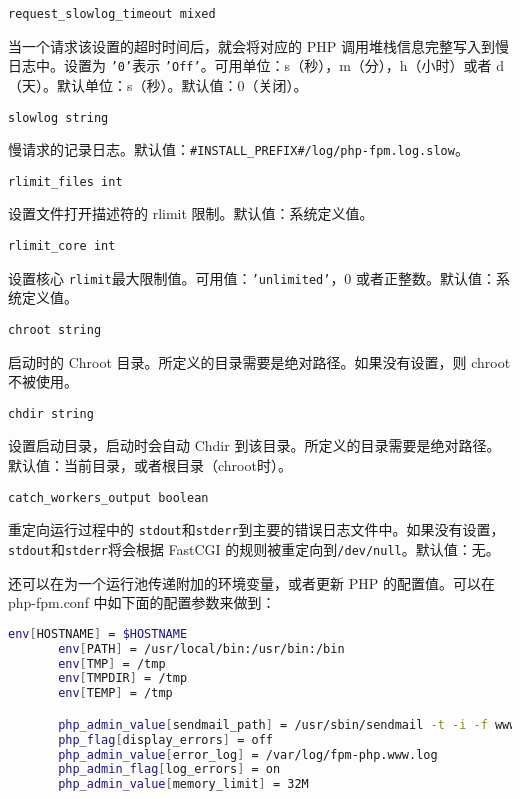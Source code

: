\begin{compactitem}
\begin{compactitem}
\item \texttt{request\_slowlog\_timeout mixed}

当一个请求该设置的超时时间后，就会将对应的 PHP 调用堆栈信息完整写入到慢日志中。设置为 \texttt{'0'}表示 \texttt{'Off'}。可用单位：s（秒），m（分），h（小时）或者 d（天）。默认单位：s（秒）。默认值：0（关闭）。

\item \texttt{slowlog string}

慢请求的记录日志。默认值：\texttt{\#INSTALL\_PREFIX\#/log/php-fpm.log.slow}。

\item \texttt{rlimit\_files int}

设置文件打开描述符的 rlimit 限制。默认值：系统定义值。

\item \texttt{rlimit\_core int}

设置核心 \texttt{rlimit}最大限制值。可用值：\texttt{'unlimited'}，0 或者正整数。默认值：系统定义值。

\item \texttt{chroot string}

启动时的 Chroot 目录。所定义的目录需要是绝对路径。如果没有设置，则 chroot 不被使用。

\item \texttt{chdir string}

设置启动目录，启动时会自动 Chdir 到该目录。所定义的目录需要是绝对路径。默认值：当前目录，或者根目录（chroot时）。

\item \texttt{catch\_workers\_output boolean}

重定向运行过程中的 \texttt{stdout}和\texttt{stderr}到主要的错误日志文件中。如果没有设置，\texttt{stdout}和\texttt{stderr}将会根据 FastCGI 的规则被重定向到\texttt{/dev/null}。默认值：无。

\end{compactitem}

\end{compactitem}

还可以在为一个运行池传递附加的环境变量，或者更新 PHP 的配置值。可以在 php-fpm.conf 中如下面的配置参数来做到：

\begin{lstlisting}[language=bash]
env[HOSTNAME] = $HOSTNAME
       env[PATH] = /usr/local/bin:/usr/bin:/bin
       env[TMP] = /tmp
       env[TMPDIR] = /tmp
       env[TEMP] = /tmp

       php_admin_value[sendmail_path] = /usr/sbin/sendmail -t -i -f www@my.domain.com
       php_flag[display_errors] = off
       php_admin_value[error_log] = /var/log/fpm-php.www.log
       php_admin_flag[log_errors] = on
       php_admin_value[memory_limit] = 32M
\end{lstlisting}

